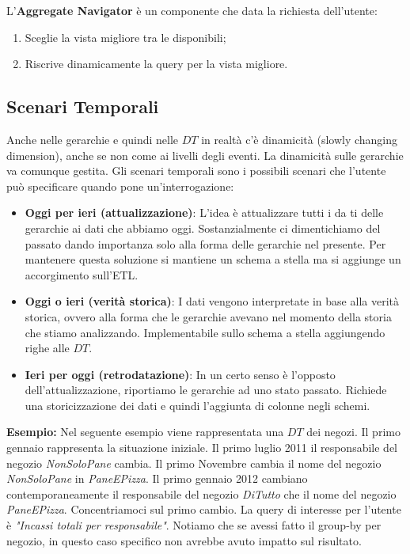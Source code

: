 L'\textbf{Aggregate Navigator} è un componente che data la richiesta dell'utente:
\begin{enumerate}
	\item Sceglie la vista migliore tra le disponibili;
	\item Riscrive dinamicamente la query per la vista migliore.
\end{enumerate}

\subsection{Scenari Temporali}
Anche nelle gerarchie e quindi nelle $DT$ in realtà c'è dinamicità (slowly changing dimension), anche se non come ai livelli degli eventi. La dinamicità sulle gerarchie va comunque gestita.
Gli scenari temporali sono i possibili scenari che l'utente può specificare quando pone un'interrogazione:
\begin{itemize}
	\item \textbf{Oggi per ieri (attualizzazione)}: L'idea è attualizzare tutti i da ti delle gerarchie ai dati che abbiamo oggi. Sostanzialmente ci dimentichiamo del passato dando importanza solo alla forma delle gerarchie nel presente. Per mantenere questa soluzione si mantiene un schema a stella ma si aggiunge un accorgimento sull'ETL.
	\item \textbf{Oggi o ieri (verità storica)}: I dati vengono interpretate in base alla verità storica, ovvero alla forma che le gerarchie avevano nel momento della storia che stiamo analizzando. Implementabile sullo schema a stella aggiungendo righe alle $DT$.
	\item \textbf{Ieri per oggi (retrodatazione)}: In un certo senso è l'opposto dell'attualizzazione, riportiamo le gerarchie ad uno stato passato. Richiede una storicizzazione dei dati e quindi l'aggiunta di colonne negli schemi.
\end{itemize}
\textbf{Esempio:}
Nel seguente esempio viene rappresentata una $DT$ dei negozi.
\noindent Il primo gennaio rappresenta la situazione iniziale. Il primo luglio 2011 il responsabile del negozio \textit{NonSoloPane} cambia. Il primo Novembre cambia il nome del negozio \textit{NonSoloPane} in \textit{PaneEPizza}. Il primo gennaio 2012 cambiano contemporaneamente il responsabile del negozio \textit{DiTutto} che il nome del negozio \textit{PaneEPizza}. Concentriamoci sul primo cambio. La query di interesse per l'utente è \textit{"Incassi totali per responsabile"}. Notiamo che se avessi fatto il group-by per negozio, in questo caso specifico non avrebbe avuto impatto sul risultato.
